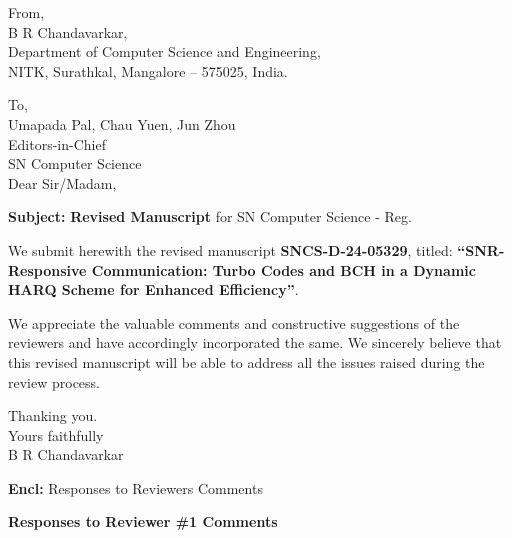 \documentclass[a4paper,10pt]{article}
\date{}
\begin{document}

	 	 	
\noindent From,\\
B R Chandavarkar,\\
Department of Computer Science and Engineering,\\
NITK, Surathkal, Mangalore – 575025, India.\\

\vspace{0.25in}

\noindent To,\\
Umapada Pal, Chau Yuen, Jun Zhou\\
Editors-in-Chief\\
SN Computer Science\\

\noindent Dear Sir/Madam,

\begin{center}
\textbf{Subject:} \textbf{Revised Manuscript} for SN Computer Science - Reg.
\end{center}

\noindent We submit herewith the revised manuscript  \textbf{SNCS-D-24-05329}, titled: \textbf{``SNR-Responsive Communication: Turbo Codes and BCH in a Dynamic HARQ Scheme for Enhanced Efficiency''}. 

\vspace{0.25in}

\noindent We appreciate the valuable comments and constructive suggestions of the reviewers and have accordingly incorporated the same. We sincerely believe that this revised manuscript will be able to address all the issues raised during the review process.

\vspace{0.25in}

\noindent Thanking you. \\

\noindent Yours faithfully \\ 

\noindent B R Chandavarkar \\

\vspace{0.25in}
 
\noindent \textbf{Encl:} Responses to Reviewers Comments


\newpage

\noindent \textbf{Responses to  Reviewer \#1 Comments}
\end{document}
